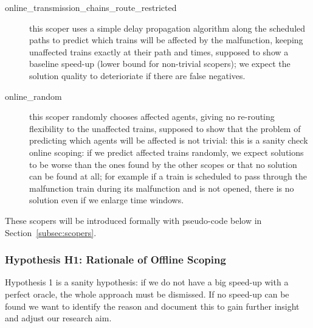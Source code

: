 \documentclass{article}
\begin{document}
\begin{description}
\item[online\_transmission\_chains\_route\_restricted] this scoper uses a simple delay propagation algorithm along the scheduled paths to predict which trains will be affected by the malfunction, keeping unaffected trains exactly at their path and times, supposed to show a baseline speed-up (lower bound for non-trivial scopers); we expect the solution quality to deterioriate if there are false negatives.
\item[online\_random] this scoper randomly chooses affected agents, giving no re-routing flexibility to the unaffected trains, supposed to show that the problem of predicting which agents will be affected is not trivial: this is a sanity check online scoping: if we predict affected trains randomly, we expect solutions to be worse than the ones found by the other scopes or that no solution can be found at all; for example if a train is scheduled to pass through the malfunction train during its malfunction and is not opened, there is no solution even if we enlarge time windows.
\end{description}

These scopers will be introduced formally with pseudo-code below in Section~\ref{subsec:scopers}.



\subsubsection{Hypothesis H1: Rationale of Offline Scoping}\label{subec:H1}

Hypothesis 1 is a sanity hypothesis: if we do not have a big speed-up with a perfect oracle, the whole approach must be dismissed. If no speed-up can be found we want to identify the reason and document this to gain further insight and adjust our research aim.
\end{document}
